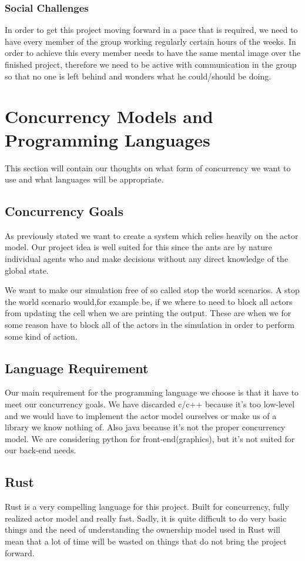 \documentclass[a4paper]{article}
\begin{document}
\subsubsection{Social Challenges}
In order to get this project moving forward in a pace that is required, we need
to have every member of the group working regularly certain hours of the weeks.
In order to achieve this every member needs to have the same mental image over
the finished project, therefore we need to be active with communication in the
group so that no one is left behind and wonders what he could/should be doing.

\section{Concurrency Models and Programming Languages}
This section will contain our thoughts on what form of concurrency we want to
use and what languages will be appropriate.
\subsection{Concurrency Goals}
As previously stated we want to create a system which relies heavily on the actor
model. Our project idea is well suited for this since the ants are by nature
individual agents who and make decisions without any direct knowledge of the
global state.

We want to make our simulation free of so called stop the world
scenarios. A stop the world scenario would,for example be, if we where to
need to block all actors from updating the cell when we are printing the
output.
These are when we for some reason have to block all of the actors in the
simulation in order to perform some kind of action.

\subsection{Language Requirement}
Our main requirement for the programming language we choose is that it have to meet our concurrency goals.
We have discarded c/c++ because it's too low-level and we would have to
implement the actor model ourselves or make us of a library we know nothing of.
Also java because it's not the proper concurrency model. We are considering python for front-end(graphics),
but it's not suited for our back-end needs.

\subsection{Rust}
Rust is a very compelling language for this project. Built for concurrency, fully realized
actor model and really fast. Sadly, it is quite difficult to do very basic things and the need
of understanding the ownership model used in Rust will mean that a lot of time will be wasted
on things that do not bring the project forward. 
\end{document}
